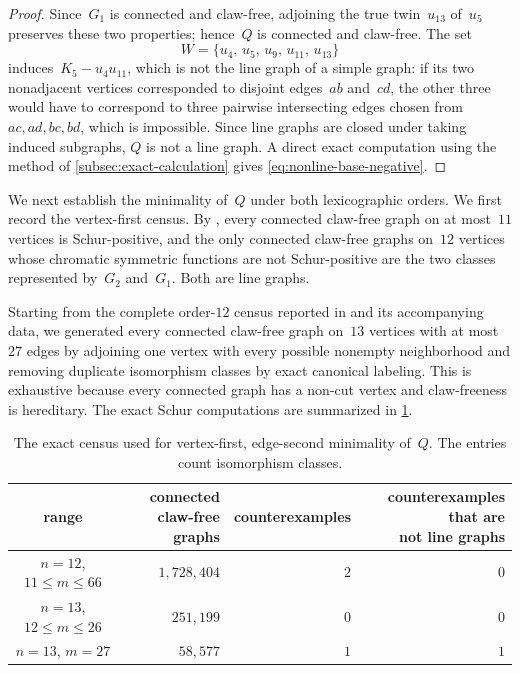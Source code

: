 \documentclass[11pt]{amsart}
\numberwithin{equation}{section}
\theoremstyle{remark}
\newcommand{\Gtwo}{G_{2}}
\newcommand{\Gone}{G_{1}}
\begin{document}
\begin{proof}
Since~$\Gone$ is connected and claw-free, adjoining the true twin~$u_{13}$
of~$u_5$ preserves these two properties; hence~$Q$ is connected and
claw-free.  The set
\[
W=\{u_4,\,u_5,\,u_9,\,u_{11},\,u_{13}\}
\]
induces~$K_5-u_4u_{11}$, which is not the line graph of a simple graph:
if its two nonadjacent vertices corresponded to disjoint edges~$ab$ and~$cd$,
the other three would have to correspond to three pairwise intersecting
edges chosen from~$ac,ad,bc,bd$, which is impossible.  Since line
graphs are closed under taking induced subgraphs, $Q$ is not a line graph.
A direct exact computation using the method of
\cref{subsec:exact-calculation} gives
\cref{eq:nonline-base-negative}.
\end{proof}



We next establish the minimality of~$Q$ under both lexicographic orders. We first record the vertex-first census.  By
\citet[Proposition~4]{Prajapati2026}, every connected claw-free graph on
at most~$11$ vertices is Schur-positive, and the only connected
claw-free graphs on~$12$ vertices whose chromatic symmetric functions
are not Schur-positive are the two classes represented by~$\Gtwo$
and~$\Gone$.  Both are line graphs.

Starting from the complete order-$12$ census reported in
\citet{Prajapati2026} and its accompanying data, we generated every
connected claw-free graph on~$13$ vertices with at most~$27$ edges by
adjoining one vertex with every possible nonempty neighborhood and
removing duplicate isomorphism classes by exact canonical labeling.
This is exhaustive because every connected graph has a non-cut vertex
and claw-freeness is hereditary.  The exact Schur computations are
summarized in \cref{tab:nonline-minimality-census}.

\begin{table}[H]
\centering
\small
\begingroup
\setlength{\tabcolsep}{5pt}
\begin{tabular}{@{}crrr@{}}
\toprule
range
& \shortstack[c]{connected claw-free\\graphs}
& counterexamples
& \shortstack[c]{counterexamples that are\\not line graphs}\\
\midrule
$n=12$, $11\le m\le66$
& $1{,}728{,}404$
& $2$
& $0$\\
$n=13$, $12\le m\le26$
& $251{,}199$
& $0$
& $0$\\
$n=13$, $m=27$
& $58{,}577$
& $1$
& $1$\\
\bottomrule
\end{tabular}
\endgroup
\caption{The exact census used for vertex-first, edge-second minimality
of~$Q$.  The entries count isomorphism classes.}
\label{tab:nonline-minimality-census}
\end{table}
\end{document}
